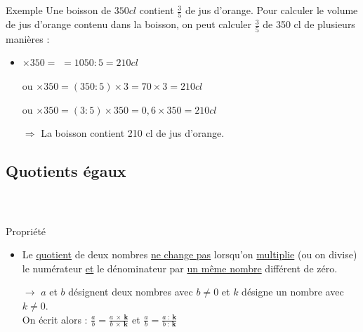\documentclass{beamer}
\begin{document}
\begin{frame}
	\frametitle{}  
	\framesubtitle{\ }
	
	\begin{exampleblock}{Exemple}
	Une boisson de $350 cl$ contient {\LARGE $\frac{3}{5}$} de jus d'orange.
	Pour calculer le volume de jus d'orange contenu dans la boisson, on peut calculer {\LARGE $\frac{3}{5}$} de 350 cl de plusieurs manières :
	
	
		\begin{itemize}
			\item  {} $ \times 350 = $ $= 1050 : 5 = 210 cl $ 
			\item[ou]   $ \times 350 = (350:5) \times 3 = 70 \times 3 = 210 cl $ 
			\item[ou]  $ \times 350 = (3:5) \times 350 = 0,6 \times 350 = 210 cl $ 
			\item[$\Rightarrow$] La boisson contient 210 cl de jus d'orange.
		\end{itemize}
	\end{exampleblock}
\end{frame}

\subsection{Quotients égaux}

\begin{frame}
	\frametitle{}  
	\framesubtitle{ \ }	
	
	\begin{block}{Propriété}
		\begin{itemize}
			
		\item Le \underline{quotient} de deux nombres \underline{ne change pas} lorsqu'on \underline{multiplie} (ou on divise) le numérateur \underline{et} le dénominateur par \underline{un même nombre} différent de zéro.\\
		
		\item[$\rightarrow$] $a$ et $b$ désignent deux nombres avec $b \neq 0$ et $k$ désigne un nombre avec $k \neq 0$.\\
		
		On écrit alors : {\LARGE $\frac{a}{b} = \frac{a \: \times  \: \textbf{k}}{b \: \times \: \textbf{k}}$} et {\LARGE $\frac{a}{b} = \frac{a \: : \: \textbf{k}}{b \: : \:\textbf{k}}$}
		\end{itemize}
	\end{block}
	
\end{frame}
\end{document}
